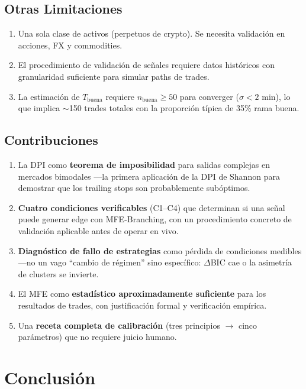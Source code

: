 \documentclass[11pt,a4paper]{article}
\begin{document}
\subsection{Otras Limitaciones}

\begin{enumerate}
    \item Una sola clase de activos (perpetuos de crypto). Se necesita validación en acciones, FX y commodities.
    \item El procedimiento de validación de señales requiere datos históricos con granularidad suficiente para simular paths de trades.
    \item La estimación de $T_{\text{buena}}$ requiere $n_{\text{buena}} \geq 50$ para converger ($\sigma < 2$ min), lo que implica $\sim$150 trades totales con la proporción típica de 35\% rama buena.
\end{enumerate}

\subsection{Contribuciones}

\begin{enumerate}
    \item La DPI como \textbf{teorema de imposibilidad} para salidas complejas en mercados bimodales ---la primera aplicación de la DPI de Shannon para demostrar que los trailing stops son probablemente subóptimos.
    \item \textbf{Cuatro condiciones verificables} (C1--C4) que determinan si una señal puede generar edge con MFE-Branching, con un procedimiento concreto de validación aplicable antes de operar en vivo.
    \item \textbf{Diagnóstico de fallo de estrategias} como pérdida de condiciones medibles ---no un vago ``cambio de régimen'' sino específico: $\Delta$BIC cae o la asimetría de clusters se invierte.
    \item El MFE como \textbf{estadístico aproximadamente suficiente} para los resultados de trades, con justificación formal y verificación empírica.
    \item Una \textbf{receta completa de calibración} (tres principios $\to$ cinco parámetros) que no requiere juicio humano.
\end{enumerate}

\section{Conclusión}
\end{document}
